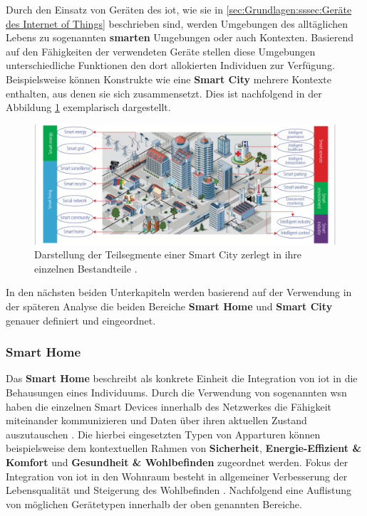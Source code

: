 Durch den Einsatz von Geräten des \ac{iot}, wie sie in \ref{sec:Grundlagen:sssec:Geräte des Internet of Things} beschrieben sind, werden Umgebungen des alltäglichen Lebens zu sogenannten \textbf{smarten} Umgebungen oder auch Kontexten. Basierend auf den Fähigkeiten der verwendeten Geräte stellen diese Umgebungen unterschiedliche Funktionen den dort allokierten Individuen zur Verfügung. Beispielsweise können Konstrukte wie eine \textbf{Smart City} mehrere Kontexte enthalten, aus denen sie sich zusammensetzt. Dies ist nachfolgend in der Abbildung \ref{fig:smart-applications} exemplarisch dargestellt.

\begin{figure}
\includegraphics[width=\textwidth]{fundamentals/pictures/Smart_Applications}
\caption{Darstellung der Teilsegmente einer Smart City zerlegt in ihre einzelnen Bestandteile \cite{Zhang2017}.}
\label{fig:smart-applications}
\end{figure}

In den nächsten beiden Unterkapiteln werden basierend auf der Verwendung in der späteren Analyse die beiden Bereiche \textbf{Smart Home} und \textbf{Smart City} genauer definiert und eingeordnet.

\subsubsection{Smart Home}
\label{sec:Grundlagen:ssec:Smarte Kontexte:sssec:Smart Home}

Das \textbf{Smart Home} beschreibt als konkrete Einheit die Integration von \ac{iot} in die Behausungen eines Individuums. Durch die Verwendung von sogenannten \acl{wsn} haben die einzelnen Smart Devices innerhalb des Netzwerkes die Fähigkeit miteinander kommunizieren und Daten über ihren aktuellen Zustand auszutauschen \cite{Biljana2017}. Die hierbei eingesetzten Typen von Apparturen können beispielsweise dem kontextuellen Rahmen von \textbf{Sicherheit}, \textbf{Energie-Effizient \& Komfort} und \textbf{Gesundheit \& Wohlbefinden} zugeordnet werden. Fokus der Integration von \ac{iot} in den Wohnraum besteht in allgemeiner Verbesserung der Lebensqualität und Steigerung des Wohlbefinden \cite{Bastos2018}. Nachfolgend eine Auflistung von möglichen Gerätetypen innerhalb der oben genannten Bereiche.

